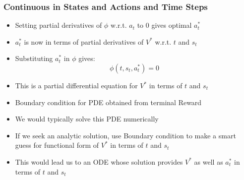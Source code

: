 \documentclass[handout]{beamer}
\begin{document}
\begin{frame}
\frametitle{Continuous in States and Actions and Time Steps}
\pause
\begin{itemize}[<+->]
\item Setting partial derivatives of $\phi$ w.r.t. $a_t$ to 0 gives optimal $a_t^*$
\item $a_t^*$ is now in terms of partial derivatives of $V^*$ w.r.t. $t$ and $s_t$
\item Substituting $a_t^*$ in $\phi$ gives:
$$\phi(t,s_t,a_t^*) = 0$$
\item This is a partial differential equation for $V^*$ in terms of $t$ and $s_t$
\item Boundary condition for PDE obtained from terminal Reward
\item We would typically solve this PDE numerically
\item If we seek an analytic solution, use Boundary condition to make a smart guess for functional form of $V^*$ in terms of $t$ and $s_t$
\item This would lead us to an ODE whose solution provides $V^*$ as well as $a_t^*$ in terms of $t$ and $s_t$
\end{itemize}
\end{frame}
\end{document}
